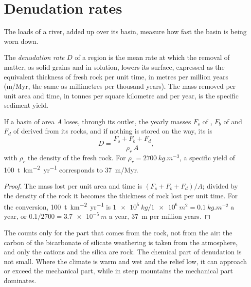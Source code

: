 \section{Denudation rates}\label{sec:b1:erosion-transport:denudation}

The loads of a river, added up over its basin, measure how fast the basin is
being worn down.

\begin{definition}\label{def:b1:erosion-transport:denudation}
The \emph{denudation rate} $D$ of a region is the mean
rate at which the removal of matter, as solid grains and in solution, lowers
its surface, expressed as the equivalent thickness of fresh rock per unit
time, in metres per million years (\unit{m/Myr}, the same as millimetres per
thousand years). The mass removed per unit area and time, in tonnes per square
kilometre and per year, is the specific sediment yield.
\end{definition}

\begin{proposition}\label{prop:b1:erosion-transport:denudation}
If a basin of area $A$ loses, through its outlet, the yearly masses $F_s$ of
, $F_b$ of  and $F_d$ of  derived from its
rocks, and if nothing is stored on the way, its  is
\[
  D = \frac{F_s + F_b + F_d}{\rho_r\,A},
\]
with $\rho_r$ the density of the fresh rock. For $\rho_r =
\qty{2700}{kg.m^{-3}}$, a specific yield of \qty{100}{t.km^{-2}.yr^{-1}}
corresponds to \qty{37}{m/Myr}.
\end{proposition}

\begin{proof}
The mass lost per unit area and time is $(F_s + F_b + F_d)/A$; divided by the
density of the rock it becomes the thickness of rock lost per unit time. For
the conversion, \qty{100}{t.km^{-2}.yr^{-1}} is
$\qty{1e5}{kg}/\qty{1e6}{m^2} = \qty{0.1}{kg.m^{-2}}$ a year, or
$0.1/2700 = \qty{3.7e-5}{m}$ a year, \qty{37}{m} per million years.
\end{proof}

The  counts only for the part that comes from the rock, not from
the air: the carbon of the bicarbonate of silicate weathering is taken from the
atmosphere, and only the cations and the silica are rock. The chemical part of
denudation is not small. Where the climate is warm and wet and the relief low,
it can approach or exceed the mechanical part, while in steep mountains the
mechanical part dominates.

